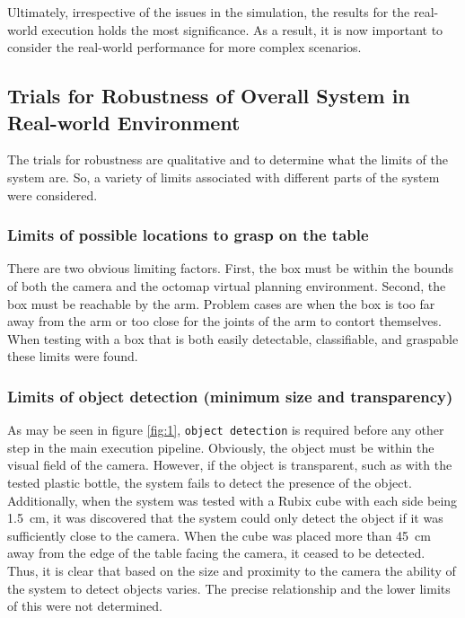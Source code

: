 \documentclass[letterpaper, 10 pt, conference]{conf/ieeeconf}  %
\begin{document}
Ultimately, irrespective of the issues in the simulation, the results for the
real-world execution holds the most significance. As a result, it is now
important to consider the real-world performance for more complex scenarios.

\subsection{Trials for Robustness of Overall System in Real-world Environment}
The trials for robustness are qualitative and to determine what the limits of
the system are. So, a variety of limits associated with different parts of the
system were considered.\\

\subsubsection{Limits of possible locations to grasp on the table}
There are two obvious limiting factors. First, the box must be within the bounds
of both the camera and the octomap virtual planning environment. Second, the box
must be reachable by the arm. Problem cases are when the box is too far away
from the arm or too close for the joints of the arm to contort themselves. When
testing with a box that is both easily detectable, classifiable, and graspable
these limits were found.\\

\subsubsection{Limits of object detection (minimum size and transparency)}
As may be seen in figure \ref{fig:1}, \texttt{object detection} is required
before any other step in the main execution pipeline. Obviously, the object must
be within the visual field of the camera. However, if the object is transparent,
such as with the tested plastic bottle, the system fails to detect the presence
of the object. Additionally, when the system was tested with a Rubix cube with
each side being \SI{1.5}{\centi\meter}, it was discovered that the system could
only detect the object if it was sufficiently close to the camera. When the cube
was placed more than \SI{45}{\centi\meter} away from the edge of the table
facing the camera, it ceased to be detected. Thus, it is clear that based on the
size and proximity to the camera the ability of the system to detect objects
varies. The precise relationship and the lower limits of this were not
determined.\\
\end{document}
